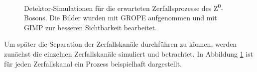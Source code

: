 \begin{figure}[h]
	\caption[Detektor-Simulationen für die erwarteten Zerfallsprozesse des Z\textsuperscript0-Bosons]{Detektor-Simulationen für die erwarteten Zerfallsprozesse des Z\textsuperscript0-Bosons. Die Bilder wurden mit GROPE aufgenommen und mit GIMP zur besseren Sichtbarkeit bearbeitet.}
	\label{fig:grope}
\end{figure}
Um später die Separation der Zerfallskanäle durchführen zu können, werden zunächst die einzelnen Zerfallskanäle simuliert und betrachtet. In Abbildung \ref{fig:grope} ist für jeden Zerfallskanal ein Prozess beispielhaft dargestellt.\\

\begin{figure}
	\centering

\end{figure}

